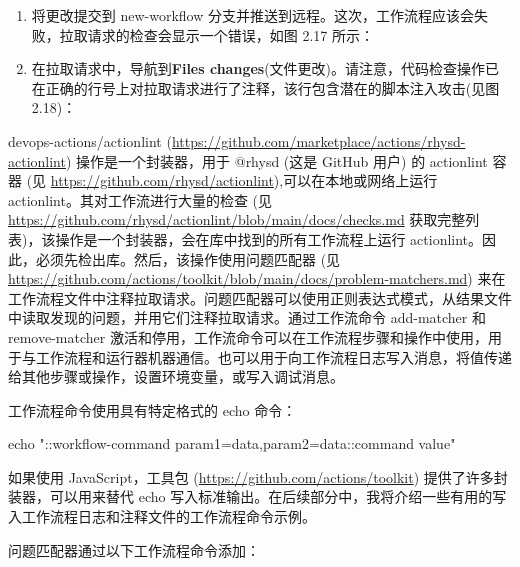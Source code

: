 \begin{enumerate}

\item 
将更改提交到 new-workflow 分支并推送到远程。这次，工作流程应该会失败，拉取请求的检查会显示一个错误，如图 2.17 所示：


\item 
在拉取请求中，导航到\textbf{Files changes}(文件更改)。请注意，代码检查操作已在正确的行号上对拉取请求进行了注释，该行包含潜在的脚本注入攻击(见图 2.18)：

\end{enumerate}


devops-actions/actionlint (\url{https://github.com/marketplace/actions/rhysd-actionlint}) 操作是一个封装器，用于 @rhysd (这是 GitHub 用户) 的 actionlint 容器 (见 \url{https://github.com/rhysd/actionlint}),可以在本地或网络上运行 actionlint。其对工作流进行大量的检查 (见 \url{https://github.com/rhysd/actionlint/blob/main/docs/checks.md} 获取完整列表)，该操作是一个封装器，会在库中找到的所有工作流程上运行 actionlint。因此，必须先检出库。然后，该操作使用问题匹配器 (见 \url{https://github.com/actions/toolkit/blob/main/docs/problem-matchers.md}) 来在工作流程文件中注释拉取请求。问题匹配器可以使用正则表达式模式，从结果文件中读取发现的问题，并用它们注释拉取请求。通过工作流命令 add-matcher 和 remove-matcher 激活和停用，工作流命令可以在工作流程步骤和操作中使用，用于与工作流程和运行器机器通信。也可以用于向工作流程日志写入消息，将值传递给其他步骤或操作，设置环境变量，或写入调试消息。

工作流程命令使用具有特定格式的 echo 命令：

\begin{shell}
  echo "::workflow-command param1={data},param2={data}::{command value}"
\end{shell}

如果使用 JavaScript，工具包 (\url{https://github.com/actions/toolkit}) 提供了许多封装器，可以用来替代 echo 写入标准输出。在后续部分中，我将介绍一些有用的写入工作流程日志和注释文件的工作流程命令示例。

问题匹配器通过以下工作流程命令添加：

